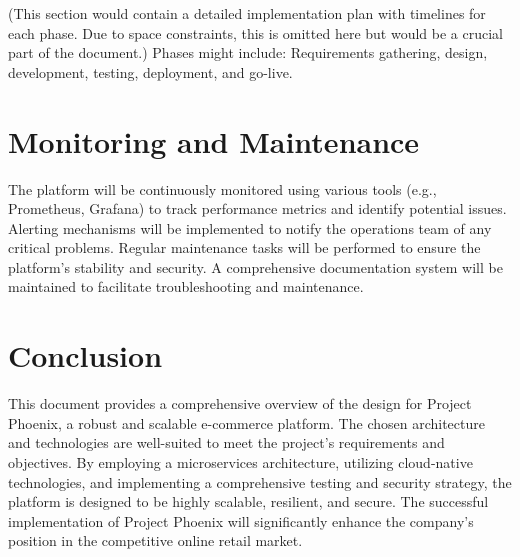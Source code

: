 \documentclass[11pt,a4paper,oneside]{article}
\begin{document}
(This section would contain a detailed implementation plan with timelines for each phase. Due to space constraints, this is omitted here but would be a crucial part of the document.)  Phases might include:  Requirements gathering, design, development, testing, deployment, and go-live.

\section{Monitoring and Maintenance}

The platform will be continuously monitored using various tools (e.g., Prometheus, Grafana) to track performance metrics and identify potential issues.  Alerting mechanisms will be implemented to notify the operations team of any critical problems.  Regular maintenance tasks will be performed to ensure the platform's stability and security.  A comprehensive documentation system will be maintained to facilitate troubleshooting and maintenance.

\section{Conclusion}

This document provides a comprehensive overview of the design for Project Phoenix, a robust and scalable e-commerce platform.  The chosen architecture and technologies are well-suited to meet the project's requirements and objectives.  By employing a microservices architecture, utilizing cloud-native technologies, and implementing a comprehensive testing and security strategy, the platform is designed to be highly scalable, resilient, and secure.  The successful implementation of Project Phoenix will significantly enhance the company's position in the competitive online retail market.
\end{document}
